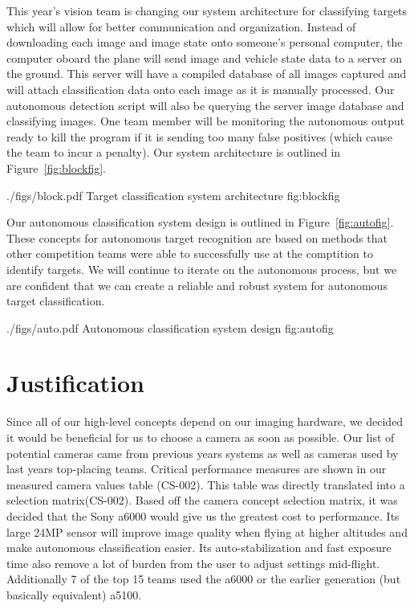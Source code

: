 \documentclass[]{auvsi_doc}
\begin{document}
This year's vision team is changing our system architecture for classifying targets which will
 allow for better communication and organization. Instead of downloading each image and image state
onto someone's personal computer, the computer oboard the plane will send image and vehicle state
data to a server on the ground. This server will have a compiled database of all images captured
and will attach classification data onto each image as it is manually processed. Our 
autonomous detection script will also be querying the server image database and classifying
images. One team member will be monitoring the autonomous output ready to kill the 
program if it is sending too many false positives (which cause the team to incur a 
penalty). Our system architecture is outlined in Figure~\ref{fig:blockfig}.

\AUVSIFigure
{./figs/block.pdf}
{\textwidth}
{Target classification system architecture}
{fig:blockfig}

Our autonomous classification system design is outlined in Figure~\ref{fig:autofig}.
These concepts for autonomous target recognition are based on methods that
other competition teams were able to successfully use at the comptition to
identify targets. We will continue to iterate on the autonomous process, but
we are confident that we can create a reliable and robust system for autonomous
target classification.

\AUVSIFigure
{./figs/auto.pdf}
{\textwidth}
{Autonomous classification system design}
{fig:autofig}

\section{Justification}

Since all of our high-level concepts depend on our imaging hardware, we decided it would be beneficial for us to choose a camera as 
soon as possible. Our list of potential cameras came from previous years systems as well as cameras used by last years top-placing 
teams. Critical performance measures are shown in our measured camera values table (CS-002). This table was directly translated 
into a selection matrix(CS-002). Based off the camera concept selection matrix, it was decided that the Sony a6000 would give us 
the greatest cost to performance. Its large 24MP sensor will improve image quality when flying at higher altitudes and make 
autonomous classification easier. Its auto-stabilization and fast exposure time also remove a lot of burden from the user to adjust 
settings mid-flight. Additionally 7 of the top 15 teams used the a6000 or the earlier generation (but basically equivalent) a5100.
\end{document}
